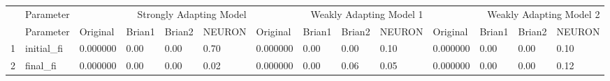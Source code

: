 \begin{tabular}{llllllllllllll}
 & Parameter & \multicolumn{4}{r}{Strongly Adapting Model} & \multicolumn{4}{r}{Weakly Adapting Model 1} & \multicolumn{4}{r}{Weakly Adapting Model 2} \\
 & Parameter & Original & Brian1 & Brian2 & NEURON & Original & Brian1 & Brian2 & NEURON & Original & Brian1 & Brian2 & NEURON \\
1 & initial_fi & 0.000000 & 0.00 & 0.00 & 0.70 & 0.000000 & 0.00 & 0.00 & 0.10 & 0.000000 & 0.00 & 0.00 & 0.10 \\
2 & final_fi & 0.000000 & 0.00 & 0.00 & 0.02 & 0.000000 & 0.00 & 0.06 & 0.05 & 0.000000 & 0.00 & 0.00 & 0.12 \\
\end{tabular}
